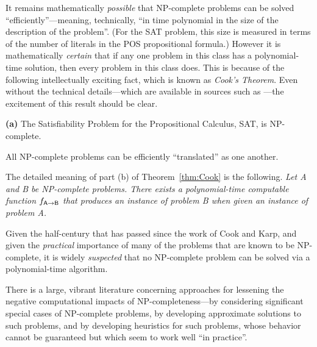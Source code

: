 {
It remains mathematically {\em possible} that {\sf NP}-complete problems can be solved ``efficiently''---meaning, technically, ``in time polynomial in the size of the description of the problem''.  (For the {\sf SAT} problem, this size is measured in terms of the number of literals in the POS propositional formula.)  However it is mathematically {\em certain} that if any one problem in this class has a polynomial-time solution, then every problem in this class does.  This is because of the following intellectually exciting fact, which is known as {\it Cook's Theorem}.  Even without the technical details---which are available in sources such as
\cite{GareyJ79,Rosenberg09}---the excitement of this result should be clear.

\begin{theorem}
\label{thm:Cook}
{\bf (a)}
The Satisfiability Problem for the Propositional Calculus, {\sf SAT}, is {\sf NP}-complete.

All {\sf NP}-complete problems can be efficiently ``translated'' as one another.
\end{theorem}

The detailed meaning of part (b) of Theorem~\ref{thm:Cook} is the following.  {\em Let {\sf A} and {\sf B} be {\sf NP}-complete problems.  There exists a polynomial-time computable function $f_{{\sf A} \rightarrow {\sf B}}$ that produces an instance of problem {\sf B} when given an instance of problem {\sf A}.}

\medskip

Given the half-century that has passed since the work of Cook and Karp, and given the {\em practical} importance of many of the problems that are known to be {\sf NP}-complete, it is widely {\em suspected} that no {\sf NP}-complete problem can be solved via a polynomial-time
algorithm.

\medskip

There is a large, vibrant literature concerning approaches for lessening the negative computational impacts of {\sf NP}-completeness---by considering significant special cases of {\sf
  NP}-complete problems, by developing approximate solutions to such problems, and by developing heuristics for such problems, whose behavior cannot be guaranteed but which seem to work well ``in practice''.

\medskip


}
